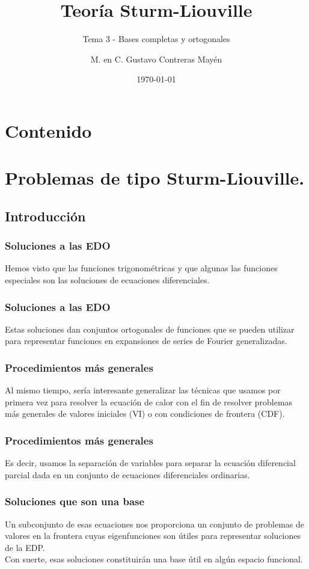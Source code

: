 \documentclass[12pt]{beamer}
\date{\today}
\title{\large{Teoría Sturm-Liouville}}
\subtitle{Tema 3 - Bases completas y ortogonales}
\author{M. en C. Gustavo Contreras Mayén}
\begin{document}
\maketitle
\fontsize{14}{14}\selectfont
{}

\section*{Contenido}


\section{Problemas de tipo Sturm-Liouville.}
\subsection{Introducción}

\begin{frame}
\frametitle{Soluciones a las EDO}
Hemos visto que las funciones trigonométricas y que algunas las funciones especiales son las soluciones de ecuaciones diferenciales.
\end{frame}
\begin{frame}
\frametitle{Soluciones a las EDO}
Estas soluciones dan conjuntos ortogonales de funciones que se pueden utilizar para representar funciones en expansiones de series de Fourier generalizadas.
\end{frame}
\begin{frame}
\frametitle{Procedimientos más generales}
Al mismo tiempo, sería interesante generalizar las técnicas que usamos por primera vez para resolver la ecuación de calor con el fin de resolver problemas más generales de valores iniciales (VI) o con condiciones de frontera (CDF).
\end{frame}
\begin{frame}
\frametitle{Procedimientos más generales}
 Es decir, usamos la separación de variables para separar la ecuación diferencial parcial dada en un conjunto de ecuaciones diferenciales ordinarias.
\end{frame}
\begin{frame}
\frametitle{Soluciones que son una base}
Un subconjunto de esas ecuaciones nos proporciona un conjunto de problemas de valores en la frontera cuyas eigenfunciones son útiles para representar soluciones de la EDP.
\\
\bigskip
\pause
Con suerte, esas soluciones constituirán una base útil en algún espacio funcional.
\end{frame}
\end{document}
